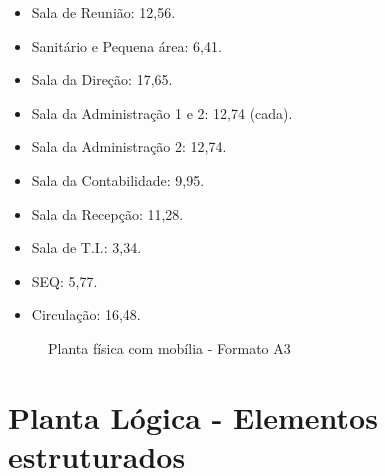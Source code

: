\documentclass[	DIV=calc,%
							paper=a4,%
							fontsize=12pt,%
							onecolumn]{scrartcl}	 					%
\begin{document}
\begin{itemize}
	\item Sala de Reunião: 12,56.
	\item Sanitário e Pequena área: 6,41.
	\item Sala da Direção: 17,65.
	\item Sala da Administração 1 e 2: 12,74 (cada).
	\item Sala da Administração 2: 12,74.
	\item Sala da Contabilidade: 9,95.
	\item Sala da Recepção: 11,28.
	\item Sala de T.I.: 3,34.
	\item SEQ: 5,77.
	\item Circulação: 16,48.
	
	
\end{itemize}


\clearpage 
\thispagestyle{empty}
\recalctypearea



\begin{figure}
	\noindent{}
	\caption{Planta física com mobília - Formato A3}
	\label{fig1}
\end{figure}

\clearpage
{}
\recalctypearea


\section{Planta Lógica - Elementos estruturados}
\end{document}
